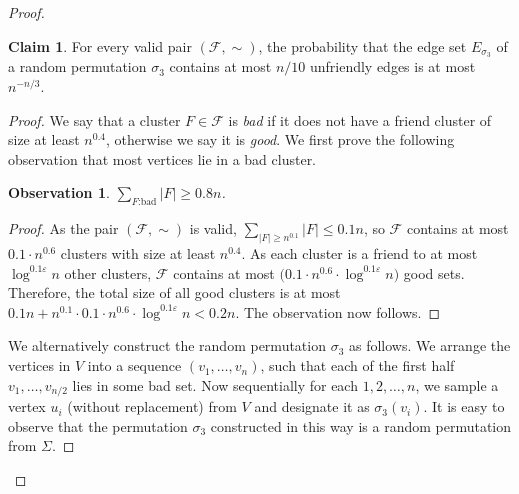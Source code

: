 \documentclass[11pt]{article}
\newtheorem{observation}[theorem]{Observation}
\theoremstyle{definition}
\newtheorem{claim}[theorem]{Claim}
\newcommand{\fset}{{\mathcal{F}}}
\newcommand{\eps}{{\varepsilon}}
\begin{document}
\begin{proof}
\begin{claim}
\label{clm: number of permutation}
For every valid pair $(\fset,\sim)$, the probability that the edge set $E_{\sigma_3}$ of a random permutation $\sigma_3$ contains at most $n/10$ unfriendly edges is at most $n^{-n/3}$.
\end{claim}
\begin{proof}
We say that a cluster $F\in \fset$ is \emph{bad} if it does not have a friend cluster of size at least $n^{0.4}$, otherwise we say it is \emph{good}. We first prove the following observation that most vertices lie in a bad cluster.

\begin{observation}
$\sum_{F\text{:bad}}|F|\ge 0.8n$.
\end{observation}
\begin{proof}
As the pair $(\fset,\sim)$ is valid, $\sum_{|F|\ge n^{0.1}}|F|\le 0.1n$, so $\fset$ contains at most $0.1\cdot n^{0.6}$ clusters with size at least $n^{0.4}$. 
As each cluster is a friend to at most $\log^{0.1\eps} n$ other clusters, $\fset$ contains at most $\big(0.1\cdot n^{0.6}\cdot\log^{0.1\eps}n\big)$ good sets. Therefore, the total size of all good clusters is at most $0.1n + n^{0.1} \cdot 0.1 \cdot n^{0.6}\cdot\log^{0.1\eps}n < 0.2n$. The observation now follows.
\end{proof}


We alternatively construct the random permutation $\sigma_3$ as follows. We arrange the vertices in $V$ into a sequence $(v_1,\ldots,v_n)$, such that each of the first half $v_1,\ldots,v_{n/2}$ lies in some bad set. Now sequentially for each $1,2,\ldots,n$, we sample a vertex $u_i$ (without replacement) from $V$ and designate it as $\sigma_3(v_i)$. It is easy to observe that the permutation $\sigma_3$ constructed in this way is a random permutation from $\Sigma$.


\end{proof}
\end{proof}
\end{document}
